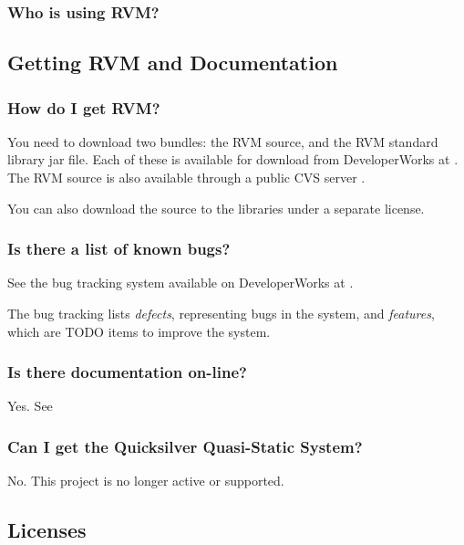 \subsubsection{Who is using RVM?}

\subsection{Getting RVM and Documentation}

\subsubsection{How do I get RVM?}

You need to download two bundles: the RVM source, and the RVM standard library
jar file.  Each of these is available for download from DeveloperWorks at
.  
The RVM source is also available through a public CVS server 
. 

You can also download the source to the libraries  under
a separate license. 

\subsubsection{Is there a list of known bugs?}

See the bug tracking system available on DeveloperWorks at 
.

The bug tracking lists {\em defects}, representing bugs in the system, and
{\em features}, which are TODO items to improve the system.

\subsubsection{Is there documentation on-line?}

Yes.  See


\subsubsection{Can I get the Quicksilver Quasi-Static System?}

No. This project is no longer active or supported.

\subsection{Licenses}

